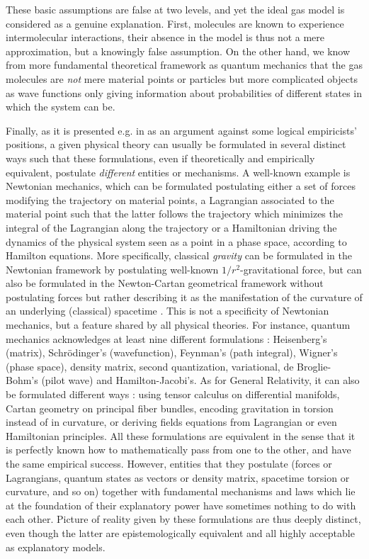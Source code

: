 \documentclass[a4paper,11pt]{article}
\theoremstyle{definition}
\begin{document}
These basic assumptions are false at two levels, and yet the ideal gas model is considered as a genuine explanation. First, molecules are known to experience intermolecular interactions, their absence in the model is thus not a mere approximation, but a knowingly false assumption. On the other hand, we know from more fundamental theoretical framework as quantum mechanics that the gas molecules are \textit{not} mere material points or particles but more complicated objects as wave functions only giving information about probabilities of different states in which the system can be.

Finally, as it is presented e.g. in \citep{Suppe2000} as an argument against some logical empiricists' positions, a given physical theory can usually be formulated in several distinct ways such that these formulations, even if theoretically and empirically equivalent, postulate \textit{different} entities or mechanisms. A well-known example is Newtonian mechanics, which can be formulated postulating either a set of forces modifying the trajectory on material points, a Lagrangian associated to the material point such that the latter follows the trajectory which minimizes the integral of the Lagrangian along the trajectory or a Hamiltonian driving the dynamics of the physical system seen as a point in a phase space, according to Hamilton equations. More specifically, classical \textit{gravity} can be formulated in the Newtonian framework by postulating well-known $1/r^2$-gravitational force, but can also be formulated in the Newton-Cartan geometrical framework without postulating forces but rather describing it as the manifestation of the curvature of an underlying (classical) spacetime \citep[Chapter~1]{Ehlers1973}. This is not a specificity of Newtonian mechanics, but a feature shared by all physical theories. For instance, quantum mechanics acknowledges at least nine different formulations \citep{Styer2002}: Heisenberg's (matrix), Schrödinger's (wavefunction), Feynman's (path integral), Wigner's (phase space), density matrix, second quantization, variational, de Broglie-Bohm's (pilot wave) and Hamilton-Jacobi's. As for General Relativity, it can also be formulated different ways \citep{Goeckeler2011, Krasnov2020, Arnowitt2008}: using tensor calculus on differential manifolds, Cartan geometry on principal fiber bundles, encoding gravitation in torsion instead of in curvature, or deriving fields equations from Lagrangian or even Hamiltonian principles. All these formulations are equivalent in the sense that it is perfectly known how to mathematically pass from one to the other, and have the same empirical success. However, entities that they postulate (forces or Lagrangians, quantum states as vectors or density matrix, spacetime torsion or curvature, and so on) together with fundamental mechanisms and laws which lie at the foundation of their explanatory power have sometimes nothing to do with each other. Picture of reality given by these formulations are thus deeply distinct, even though the latter are epistemologically equivalent and all highly acceptable as explanatory models. 
\end{document}
